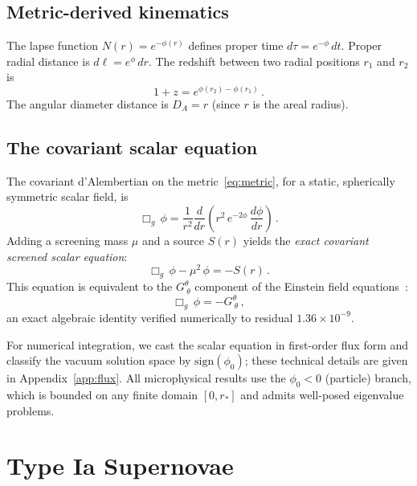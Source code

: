 \documentclass[aps,prd,twocolumn,superscriptaddress,nofootinbib,longbibliography]{revtex4-2}
\newcommand{\rstar}{r_{*}}
\newcommand{\phiz}{\phi_0}
\begin{document}
\subsection{Metric-derived kinematics}

The lapse function $N(r) = e^{-\phi(r)}$ defines proper time
$d\tau = e^{-\phi}\,dt$.  Proper radial distance is
$d\ell = e^{\phi}\,dr$.  The redshift between two radial positions
$r_1$ and $r_2$ is
\begin{equation}\label{eq:redshift}
  1 + z = e^{\phi(r_2) - \phi(r_1)}\,.
\end{equation}
The angular diameter distance is $D_A = r$ (since $r$ is the areal
radius).

\subsection{The covariant scalar equation}

The covariant d'Alembertian on the metric~\eqref{eq:metric}, for
a static, spherically symmetric scalar field, is
\begin{equation}\label{eq:box}
  \Box_g\,\phi = \frac{1}{r^2}\frac{d}{dr}
    \!\left(r^2\,e^{-2\phi}\,\frac{d\phi}{dr}\right)\,.
\end{equation}
Adding a screening mass $\mu$ and a source $S(r)$ yields the
\emph{exact covariant screened scalar equation}:
\begin{equation}\label{eq:kg}
  \Box_g\,\phi - \mu^2\,\phi = -S(r)\,.
\end{equation}
This equation is equivalent to the $G^\theta_{\ \theta}$
component of the Einstein field equations~\cite{zenodo2025}:
\begin{equation}\label{eq:kgidentity}
  \Box_g\,\phi = -G^\theta_{\ \theta}\,,
\end{equation}
an exact algebraic identity verified numerically to residual
$1.36 \times 10^{-9}$.

For numerical integration, we cast the scalar equation in first-order
flux form and classify the vacuum solution space by
$\mathrm{sign}(\phiz)$; these technical details are given in
Appendix~\ref{app:flux}.  All microphysical results use the
$\phiz < 0$ (particle) branch, which is bounded on any finite domain
$[0, \rstar]$ and admits well-posed eigenvalue problems.

\section{Type Ia Supernovae}\label{sec:sne}
\end{document}
